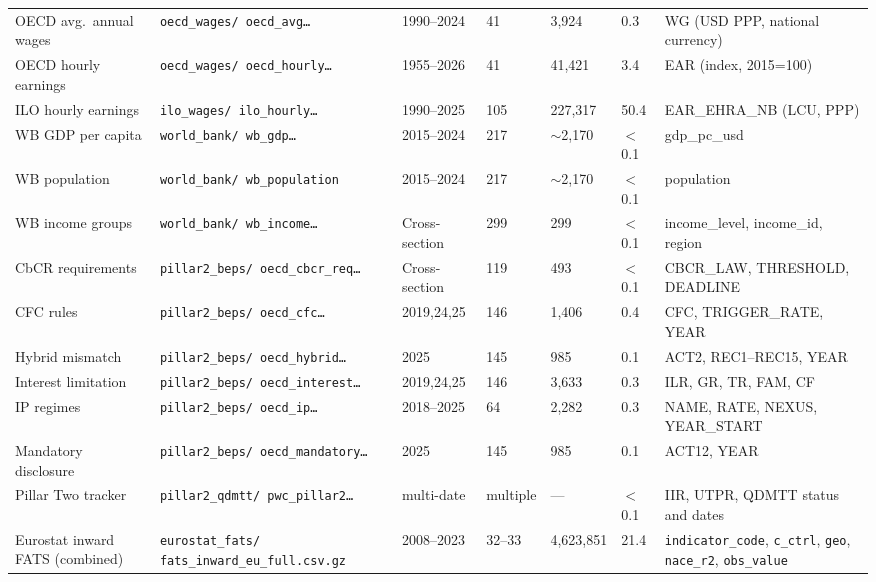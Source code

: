 \documentclass[11pt,a4paper]{article}
\begin{document}
\begin{landscape}
\begin{longtable}{L{3.0cm} L{3.2cm} C{1.4cm} C{1.4cm} C{1.6cm} C{1.3cm} L{4.0cm}}
    \midrule
    OECD avg.\ annual wages & \texttt{oecd\_wages/ oecd\_avg\ldots} & 1990--2024 & 41 & 3{,}924 & 0.3 & WG (USD PPP, national currency) \\[4pt]
    OECD hourly earnings & \texttt{oecd\_wages/ oecd\_hourly\ldots} & 1955--2026 & 41 & 41{,}421 & 3.4 & EAR (index, 2015=100) \\[4pt]
    ILO hourly earnings & \texttt{ilo\_wages/ ilo\_hourly\ldots} & 1990--2025 & 105 & 227{,}317 & 50.4 & EAR\_EHRA\_NB (LCU, PPP) \\[4pt]
    \midrule
    WB GDP per capita & \texttt{world\_bank/ wb\_gdp\ldots} & 2015--2024 & 217 & $\sim$2{,}170 & $<$0.1 & gdp\_pc\_usd \\[4pt]
    WB population & \texttt{world\_bank/ wb\_population} & 2015--2024 & 217 & $\sim$2{,}170 & $<$0.1 & population \\[4pt]
    WB income groups & \texttt{world\_bank/ wb\_income\ldots} & Cross-section & 299 & 299 & $<$0.1 & income\_level, income\_id, region \\[4pt]
    \midrule
    CbCR requirements & \texttt{pillar2\_beps/ oecd\_cbcr\_req\ldots} & Cross-section & 119 & 493 & $<$0.1 & CBCR\_LAW, THRESHOLD, DEADLINE \\[4pt]
    CFC rules & \texttt{pillar2\_beps/ oecd\_cfc\ldots} & 2019,24,25 & 146 & 1{,}406 & 0.4 & CFC, TRIGGER\_RATE, YEAR \\[4pt]
    Hybrid mismatch & \texttt{pillar2\_beps/ oecd\_hybrid\ldots} & 2025 & 145 & 985 & 0.1 & ACT2, REC1--REC15, YEAR \\[4pt]
    Interest limitation & \texttt{pillar2\_beps/ oecd\_interest\ldots} & 2019,24,25 & 146 & 3{,}633 & 0.3 & ILR, GR, TR, FAM, CF \\[4pt]
    IP regimes & \texttt{pillar2\_beps/ oecd\_ip\ldots} & 2018--2025 & 64 & 2{,}282 & 0.3 & NAME, RATE, NEXUS, YEAR\_START \\[4pt]
    Mandatory disclosure & \texttt{pillar2\_beps/ oecd\_mandatory\ldots} & 2025 & 145 & 985 & 0.1 & ACT12, YEAR \\[4pt]
    Pillar Two tracker & \texttt{pillar2\_qdmtt/ pwc\_pillar2\ldots} & multi-date & multiple & --- & $<$0.1 & IIR, UTPR, QDMTT status and dates \\[4pt]
    Eurostat inward FATS (combined) & \texttt{eurostat\_fats/ fats\_inward\_eu\_full.csv.gz} & 2008--2023 & 32--33 & 4{,}623{,}851 & 21.4 & \texttt{indicator\_code}, \texttt{c\_ctrl}, \texttt{geo}, \texttt{nace\_r2}, \texttt{obs\_value} \\[4pt]
\end{longtable}
\end{landscape}
\end{document}
